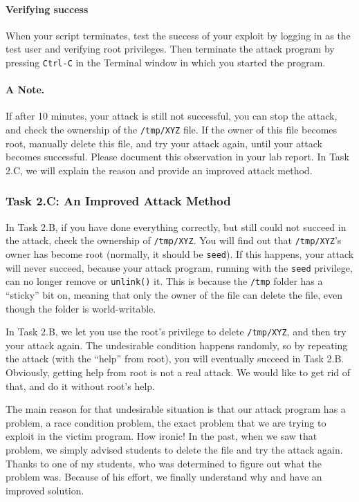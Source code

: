 \paragraph{Verifying success}
When your script terminates,
test the success of your exploit by logging in as the test user and
verifying root privileges.  Then terminate the attack program by pressing \texttt{Ctrl-C} in the Terminal window in which you started the program.


\paragraph{A Note.}
If after 10 minutes, your attack is still not 
successful, you can stop the attack, and check the ownership
of the \texttt{/tmp/XYZ} file. If the owner of this file
becomes root, manually delete this file, and try your 
attack again, until your attack becomes successful. 
Please document this observation in your lab report. 
In Task 2.C, we will explain the reason and provide
an improved attack method. 



\subsubsection{Task 2.C: An Improved Attack Method}

In Task 2.B, if you have done everything correctly, but still could not succeed
in the attack, check the ownership of \texttt{/tmp/XYZ}. You will find out    
that \texttt{/tmp/XYZ}'s owner has become root (normally, it should be \texttt{seed}). 
If this happens, your attack will never succeed, because your attack
program, running with the \texttt{seed} privilege, can no longer remove or
\texttt{unlink()} it.  
This is because the \texttt{/tmp}
folder has a ``sticky'' bit on, meaning that only the owner of the file can
delete the file, even though the folder is world-writable. 


In Task 2.B, we let you use the root's privilege to delete \texttt{/tmp/XYZ}, 
and then try your attack again. The undesirable condition happens randomly,
so by repeating the attack (with the ``help'' from root), you will eventually
succeed in Task 2.B. Obviously, getting help from root is not a real attack. 
We would like to get rid of that, and do it without root's help.


The main reason for that undesirable situation is that 
our attack program has a problem, a race condition problem, the exact problem that
we are trying to exploit in the victim program. How ironic!  
In the past, when we saw that problem, we simply advised students to 
delete the file and try the attack again. Thanks to one of my students, 
who was determined to figure out what the problem was. Because of his effort,
we finally understand why and have an improved solution. 


